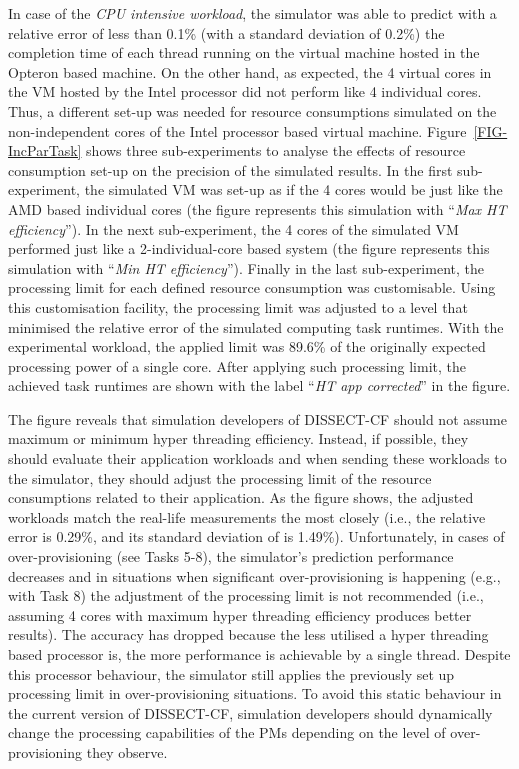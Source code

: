 \documentclass[sort, compress, 5p]{elsarticle}
\begin{document}
In case of the \emph{CPU intensive workload}, the simulator was able to predict with a relative error of less than 0.1\% (with a standard deviation of 0.2\%) the completion time of each thread running on the virtual machine hosted in the Opteron based machine. On the other hand, as expected, the 4 virtual cores in the VM hosted by the Intel processor did not perform like 4 individual cores. Thus, a different set-up was needed for resource consumptions simulated on the non-independent cores of the Intel processor based virtual machine. Figure~\ref{FIG-IncParTask} shows three sub-experiments to analyse the effects of resource consumption set-up on the precision of the simulated results. In the first sub-experiment, the simulated VM was set-up as if the 4 cores would be just like the AMD based individual cores (the figure represents this simulation with ``\emph{Max HT efficiency}''). In the next sub-experiment, the 4 cores of the simulated VM performed just like a 2-individual-core based system (the figure represents this simulation with ``\emph{Min HT efficiency}''). Finally in the last sub-experiment, the processing limit  for each defined resource consumption was customisable. Using this customisation facility, the processing limit was adjusted to a level that minimised the relative error of the simulated computing task runtimes. With the experimental workload, the applied limit was 89.6\% of the originally expected processing power of a single core. After applying such processing limit, the achieved task runtimes are shown with the label ``\emph{HT app corrected}'' in the figure.

The figure reveals that simulation developers of DISSECT-CF should not assume maximum or minimum hyper threading efficiency. Instead, if possible, they should evaluate their application workloads and when sending these workloads to the simulator, they should adjust the processing limit of the resource consumptions related to their application. As the figure shows, the adjusted workloads match the real-life measurements the most closely (i.e., the relative error is 0.29\%, and its standard deviation of is 1.49\%). Unfortunately, in cases of over-provisioning (see Tasks 5-8), the simulator's prediction performance decreases and in situations when significant over-provisioning is happening (e.g., with Task 8) the adjustment of the processing limit is not recommended (i.e., assuming 4 cores with maximum hyper threading efficiency produces better results). The accuracy has dropped because the less utilised a hyper threading based processor is, the more performance is achievable by a single thread. Despite this processor behaviour, the simulator still applies the previously set up processing limit in over-provisioning situations. To avoid this static behaviour in the current version of DISSECT-CF, simulation developers should dynamically change the processing capabilities of the PMs depending on the level of over-provisioning they observe.
\end{document}
